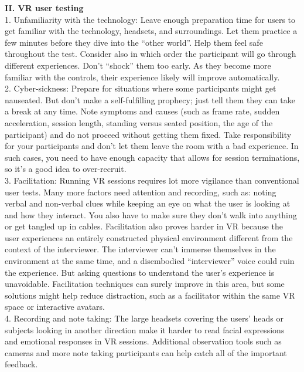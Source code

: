     \textbf{II. VR user testing}\\
    1. Unfamiliarity with the technology: Leave enough preparation time for users to get familiar with the technology, headsets, and surroundings. Let them practice a few minutes before they dive into the “other world”. Help them feel safe throughout the test. Consider also in which order the participant will go through different experiences. Don’t “shock” them too early. As they become more familiar with the controls, their experience likely will improve automatically.\\
    
    2. Cyber-sickness: Prepare for situations where some participants might get nauseated. But don’t make a self-fulfilling prophecy; just tell them they can take a break at any time. Note symptoms and causes (such as frame rate, sudden acceleration, session length, standing versus seated position, the age of the participant) and do not proceed without getting them fixed. Take responsibility for your participants and don’t let them leave the room with a bad experience. In such cases, you need to have enough capacity that allows for session terminations, so it’s a good idea to over-recruit.\\
    
    3. Facilitation: Running VR sessions requires lot more vigilance than conventional user tests. Many more factors need attention and recording, such as: noting verbal and non-verbal clues while keeping an eye on what the user is looking at and how they interact. You also have to make sure they don’t walk into anything or get tangled up in cables. Facilitation also proves harder in VR because the user experiences an entirely constructed physical environment different from the context of the interviewer. The interviewer can’t immerse themselves in the environment at the same time, and a disembodied “interviewer” voice could ruin the experience. But asking questions to understand the user’s experience is unavoidable. Facilitation techniques can surely improve in this area, but some solutions might help reduce distraction, such as a facilitator within the same VR space or interactive avatars.\\
    
    4. Recording and note taking: The large headsets covering the users’ heads or subjects looking in another direction make it harder to read facial expressions and emotional responses in VR sessions. Additional observation tools such as cameras and more note taking participants can help catch all of the important feedback.\\
    
